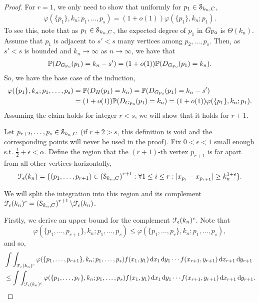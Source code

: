 \begin{proof}
For $r=1$, we only need to show that uniformly for $p_1 \in \mathcal{S}_{k_n,C}$,
\begin{align*}
\varphi(\{p_1\}, k_n ;p_1,\dots,p_s) = (1+o(1))\varphi(\{p_1\}, k_n ;p_1).
\end{align*}
To see this, note that as $p_1\in \mathcal{S}_{k_n,C}$, the expected degree of $p_1$ in $G_{{\mathrm{Po}}}$ is $\Theta(k_n)$. Assume that $p_1$ is adjacent to $s'<s$ many vertices among $p_2,\dots,p_s$. Then, as $s'<s$ is bounded and $k_n \rightarrow \infty$ as $n\rightarrow \infty$,  we have that
\begin{align*}
\mathbb{P}(D_{G_{{\mathrm{Po}}}}(p_1)=k_n-s') = (1+o(1))\mathbb{P}(D_{G_{{\mathrm{Po}}}}(p_1)=k_n).
\end{align*}
So, we have the base case of the induction,
\begin{align*}
\varphi(\{p_1\}, k_n ;p_1,\dots,p_s)&=\mathbb{P}(D_H(p_1)=k_n)
= \mathbb{P}(D_{G_{{\mathrm{Po}}}}(p_1)=k_n-s')\\
&= (1+o(1))\mathbb{P}(D_{G_{{\mathrm{Po}}}}(p_1)=k_n)=(1+o(1))\varphi(\{p_1\}, k_n ;p_1).
\end{align*}
Assuming the claim holds for integer $r <s$, we will show that it holds for $r+1$.

Let $p_{r+2},\dots,p_s\in \mathcal{S}_{k_n,C}$ (if $r+2>s$, this definition is void and the corresponding points will never be used in the proof).
Fix $0<\epsilon<1$ small enough s.t. $\frac{1}{2}+\epsilon<\alpha$. Define the region that the $(r+1)$-th vertex $p_{r+1}$ is far apart from all other vertices horizontally,
$$\mathcal{F}_\epsilon(k_n)=\{(p_1,\dots,p_{r+1}) \in \left(\mathcal{S}_{k_n,C}\right)^{r+1}: \forall 1\leq i \leq r: |x_{p_i}-x_{p_{r+1}}|\geq k_n^{1+\epsilon}\}.$$

We will split the integration into this region and its complement $\mathcal{F}_\epsilon(k_n)^c = \left(\mathcal{S}_{k_n,C}\right)^{r+1} \backslash \mathcal{F}_\epsilon(k_n)$.

Firstly, we derive an upper bound for the complement $\mathcal{F}_\epsilon(k_n)^c$. Note that 
\[
	\varphi(\{p_1,\dots,p_{r+1}\}, k_n ;p_1,\dots,p_s) \leq \varphi(\{p_1,\dots,p_r\}, k_n ;p_1,\dots,p_s),
\]
and so,
\begin{align*}
	&\int \int_{\mathcal{F}_\epsilon(k_n)^c} \varphi(\{p_1,\dots,p_{r+1}\}, k_n ;p_1,\dots,p_s)
		f(x_1,y_1) \operatorname{\mathrm{d}\hspace{-2pt}} x_1 \operatorname{\mathrm{d}\hspace{-2pt}} y_1 \cdots f(x_{r+1},y_{r+1})\operatorname{\mathrm{d}\hspace{-2pt}} x_{r+1} \operatorname{\mathrm{d}\hspace{-2pt}} y_{r+1}\\
	&\leq \int \int_{\mathcal{F}_\epsilon(k_n)^c} \varphi(\{p_1,\dots,p_r\}, k_n ;p_1,\dots,p_s)
		f(x_1,y_1) \operatorname{\mathrm{d}\hspace{-2pt}} x_1 \operatorname{\mathrm{d}\hspace{-2pt}} y_1 \cdots f(x_{r+1},y_{r+1})\operatorname{\mathrm{d}\hspace{-2pt}} x_{r+1} \operatorname{\mathrm{d}\hspace{-2pt}} y_{r+1}.
\end{align*}


\end{proof}
